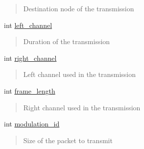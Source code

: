 \begin{DoxyCompactItemize}
\begin{DoxyCompactList}
\begin{quote}
Destination node of the transmission \end{quote}
\end{DoxyCompactList}\item 
\mbox{\label{structNotification_ad3d19dc302e88f3d7f0dfcbb2e4d0174}} 
int \hyperlink{structNotification_ad3d19dc302e88f3d7f0dfcbb2e4d0174}{left\+\_\+channel}
\begin{DoxyCompactList}\small\item\em \begin{quote}
Duration of the transmission \end{quote}
\end{DoxyCompactList}\item 
\mbox{\label{structNotification_aee5c4a59db06180176e0bf40d3bc32d5}} 
int \hyperlink{structNotification_aee5c4a59db06180176e0bf40d3bc32d5}{right\+\_\+channel}
\begin{DoxyCompactList}\small\item\em \begin{quote}
Left channel used in the transmission \end{quote}
\end{DoxyCompactList}\item 
\mbox{\label{structNotification_a72014fb56946d8358523b8e1bec188f5}} 
int \hyperlink{structNotification_a72014fb56946d8358523b8e1bec188f5}{frame\+\_\+length}
\begin{DoxyCompactList}\small\item\em \begin{quote}
Right channel used in the transmission \end{quote}
\end{DoxyCompactList}\item 
\mbox{\label{structNotification_aff3003b26e95c5fd93f66cd4f636758f}} 
int \hyperlink{structNotification_aff3003b26e95c5fd93f66cd4f636758f}{modulation\+\_\+id}
\begin{DoxyCompactList}\small\item\em \begin{quote}
Size of the packet to transmit \end{quote}
\end{DoxyCompactList}\item 
\mbox{\label{structNotification_af562f68f9bdd5b058b4f6a20d84f9818}} 

\end{DoxyCompactItemize}

